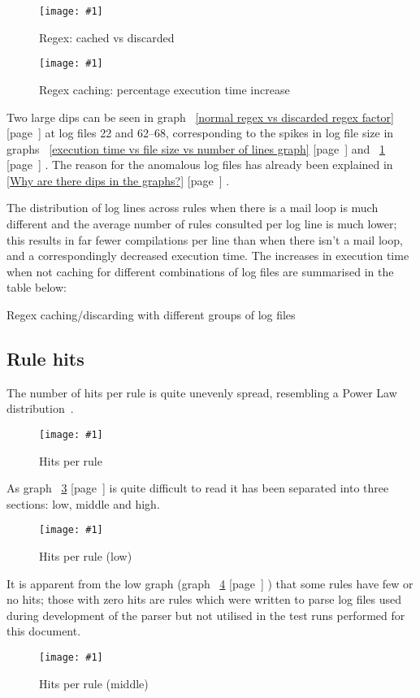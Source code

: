 \documentclass[a4paper,12pt,draft]{article}
\newcommand{\showgraph}[3]{
    \begin{figure}[hbt!]
        \caption{#2}\label{#3}
        \texttt{[image: \#1]}
    \end{figure}
}
\newcommand{\showtable}[3]{
    \begin{table}[ht]
        \caption{#2}\label{#3}
        
    \end{table}
}
\newcommand{\refwithpage}[1]{%
    \empty{}\ref{#1} [page~\pageref{#1}]%
}
\newcommand{\sectionref}[1]{%
    \textsection{}\refwithpage{#1}%
}
\begin{document}
\showgraph{build/plot-cached-discarded}{Regex: cached vs
discarded}{normal regex vs discard regex}

\showgraph{build/plot-cached-discarded-factor}{Regex caching: percentage
execution time increase}{normal regex vs discarded regex factor}

Two large dips can be seen in graph~\refwithpage{normal regex vs discarded
regex factor} at log files 22 and 62--68, corresponding to the spikes in
log file size in graphs~\refwithpage{execution time vs file size vs number
of lines graph} and~\refwithpage{normal regex vs discard regex}.  The
reason for the anomalous log files has already been explained in
\sectionref{Why are there dips in the graphs?}.

The distribution of log lines across rules when there is a mail loop is
much different and the average number of rules consulted per log line is
much lower; this results in far fewer \regex{} compilations per line than
when there isn't a mail loop, and a correspondingly decreased execution
time.  The increases in execution time when not caching \regexes{} for
different combinations of log files are summarised in the table below:

\showtable{build/stats-cached-discarded-include-for-graph}
{Regex caching/discarding with different groups of log files}
{Regex caching/discarding with different groups of log files}


\subsection{Rule hits}
\label{rule hits}

The number of hits per rule is quite unevenly spread, resembling a Power
Law distribution~\cite{powerlaw}.

\showgraph{build/plot-hits}{Hits per rule}{rule hits graph}

As graph~\refwithpage{rule hits graph} is quite difficult to read it has
been separated into three sections: low, middle and high.

\showgraph{build/plot-hits-low}{Hits per rule (low)}{hits per rule low}

It is apparent from the low graph (graph~\refwithpage{hits per rule low})
that some rules have few or no hits; those with zero hits are rules which
were written to parse log files used during development of the parser but
not utilised in the test runs performed for this document.

\showgraph{build/plot-hits-middle}{Hits per rule (middle)}{hits per rule
middle}
\end{document}
